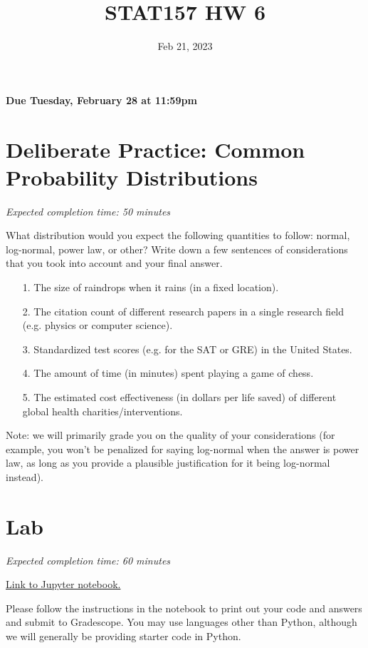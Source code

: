 \documentclass[11pt]{article}
\title{STAT157 HW 6}
\date{Feb 21, 2023}
\begin{document}
\maketitle

\hfill \textbf{Due Tuesday, February 28 at 11:59pm}

\section*{Deliberate Practice: Common Probability Distributions}

\emph{Expected completion time: 50 minutes}

What distribution would you expect the following quantities to follow: normal, log-normal, power law, or other? Write down a few sentences of considerations that you took into account and your final answer. 

\begin{enumerate}
	\item[1.] The size of raindrops when it rains (in a fixed location).
	\item[2.] The citation count of different research papers in a single research field (e.g. physics or computer science).
	\item[3.] Standardized test scores (e.g. for the SAT or GRE) in the United States.
	\item[4.] The amount of time (in minutes) spent playing a game of chess.
	\item[5.] The estimated cost effectiveness (in dollars per life saved) of different global health charities/interventions.
\end{enumerate}

Note: we will primarily grade you on the quality of your considerations (for example, you won't be penalized for saying log-normal when the answer is power law, as long as you provide a plausible justification for it being log-normal instead).

\section*{Lab}

\emph{Expected completion time: 60 minutes}

\href{http://datahub.berkeley.edu/hub/user-redirect/git-pull?repo=https%3A%2F%2Fgithub.com%2Fjs-d%2Fforecasting-class-sp23&urlpath=tree%2Fforecasting-class-sp23%2Fhw%2Fhw6%2Fhw6lab.ipynb&branch=main}{Link to Jupyter notebook.}

Please follow the instructions in the notebook to print out your code and answers and submit to Gradescope. You may use languages other than Python, although we will generally be providing starter code in Python.
\end{document}
